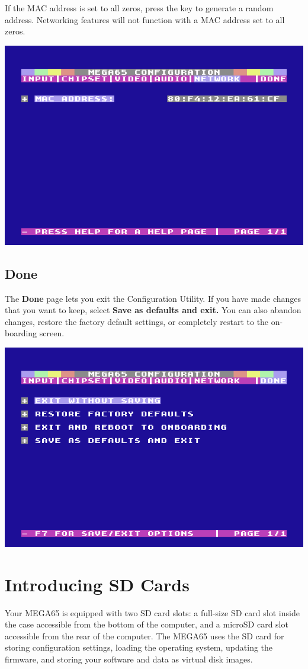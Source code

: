 If the MAC address is set to all zeros, press the  key to generate a random address. Networking features will not function with a MAC address set to all zeros.

\begin{center}
  \includegraphics[width=0.7\linewidth]{images/ss-m65config-5.png}
\end{center}

\subsection{Done}

The {\bf Done} page lets you exit the Configuration Utility. If you have made changes that you want to keep, select {\bf Save as defaults and exit.} You can also abandon changes, restore the factory default settings, or completely restart to the on-boarding screen.

\begin{center}
  \includegraphics[width=0.7\linewidth]{images/ss-m65config-save.png}
\end{center}


\section{Introducing SD Cards}
\label{sec:introducing-sd-cards}
\nopagebreak
Your MEGA65 is equipped with two SD card slots: a full-size SD card slot inside the case accessible from the bottom of the computer, and a microSD card slot accessible from the rear of the computer. The MEGA65 uses the SD card for storing configuration settings, loading the operating system, updating the firmware, and storing your software and data as virtual disk images.

